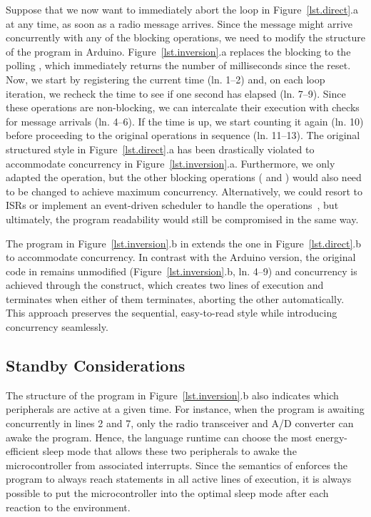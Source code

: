 Suppose that we now want to immediately abort the loop in
Figure~\ref{lst.direct}.a at any time, as soon as a radio message arrives.
%
Since the message might arrive concurrently with any of the blocking
operations, we need to modify the structure of the program in Arduino.
%
Figure~\ref{lst.inversion}.a replaces the blocking  to the polling
, which immediately returns the number of milliseconds since the
reset.
Now, we start by registering the current time (ln. 1--2) and, on each loop
iteration, we recheck the time to see if one second has elapsed (ln. 7--9).
Since these operations are non-blocking, we can intercalate their execution
with checks for message arrivals (ln. 4--6).
If the time is up, we start counting it again (ln. 10) before proceeding to the
original operations in sequence (ln. 11--13).
%
The original structured style in Figure~\ref{lst.direct}.a has been drastically
violated to accommodate concurrency in Figure~\ref{lst.inversion}.a.
Furthermore, we only adapted the  operation, but the other blocking
operations ( and ) would also need to be
changed to achieve maximum concurrency.
%
Alternatively, we could resort to ISRs or implement an event-driven
scheduler to handle the operations~\cite{wsn.nesc}, but ultimately, the
program readability would still be compromised in the same way.

The program in Figure~\ref{lst.inversion}.b in \CEU extends the one in
Figure~\ref{lst.direct}.b to accommodate concurrency.
%
In contrast with the Arduino version, the original code in \CEU remains
unmodified (Figure~\ref{lst.inversion}.b, ln. 4--9) and concurrency is achieved
through the  construct, which creates two lines of execution and
terminates when either of them terminates, aborting the other automatically.
%
This approach preserves the sequential, easy-to-read style while introducing
concurrency seamlessly.

\subsection{Standby Considerations}
\label{sec.ceu.standby}

The structure of the program in Figure~\ref{lst.inversion}.b also indicates
which peripherals are active at a given time.
%
For instance, when the program is awaiting concurrently in lines 2 and 7,
only the radio transceiver and A/D converter can awake the program.
Hence, the language runtime can choose the most energy-efficient sleep mode
that allows these two peripherals to awake the microcontroller from associated
interrupts.
%
Since the semantics of \CEU enforces the program to always reach 
statements in all active lines of execution, it is always possible to put the
microcontroller into the optimal sleep mode after each reaction to the
environment.

